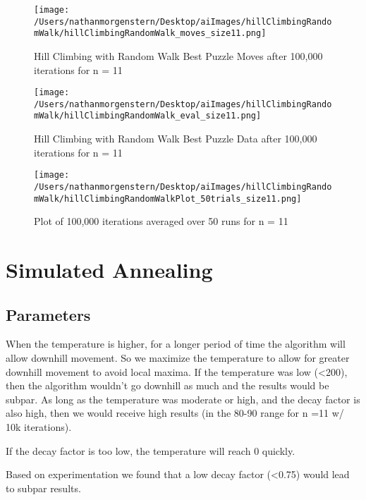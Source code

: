 \documentclass{report}
\begin{document}
	\begin{figure}[H]
	\centering
	\texttt{[image: /Users/nathanmorgenstern/Desktop/aiImages/hillClimbingRandomWalk/hillClimbingRandomWalk\_moves\_size11.png]}
	\caption{Hill Climbing with Random Walk Best Puzzle Moves after 100,000 iterations for n = 11} 
	\label{fig: Hill Climbing with Random Walk Best Puzzle Moves after 100,000 iterations for n = 11}
	\end{figure}

	\begin{figure}[H]
	\centering
	\texttt{[image: /Users/nathanmorgenstern/Desktop/aiImages/hillClimbingRandomWalk/hillClimbingRandomWalk\_eval\_size11.png]}
	\caption{Hill Climbing with Random Walk Best Puzzle Data after 100,000 iterations for n = 11} 
	\label{fig: Hill Climbing with Random Walk Best Puzzle Data after 100,000 iterations for n = 11}
	\end{figure}

	\begin{figure}[H]
	\centering
	\texttt{[image: /Users/nathanmorgenstern/Desktop/aiImages/hillClimbingRandomWalk/hillClimbingRandomWalkPlot\_50trials\_size11.png]}
	\caption{Plot of 100,000 iterations averaged over 50 runs for n = 11}
	\label{fig: Plot of 100,000 iterations averaged over 50 runs for n = 11}
	\end{figure}


\newpage
\section{Simulated Annealing}
\subsection{Parameters}
When the temperature is higher, for a longer period of time the algorithm will allow downhill movement. So we maximize the temperature to allow for greater downhill movement to avoid local maxima.
If the temperature was low (<200), then the algorithm wouldn't go downhill as much and the results would be subpar. As long as the temperature was moderate or high, and the decay factor is also high, then we would receive high results (in the 80-90 range for n =11 w/ 10k iterations).

If the decay factor is too low, the temperature will reach 0 quickly.

Based on experimentation we found that a low decay factor (<0.75) would lead to subpar results. 
\end{document}
